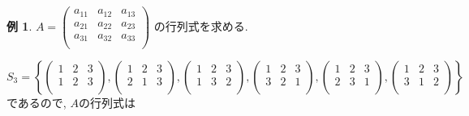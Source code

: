 \documentclass[dvipdfmx,a4paper,11pt]{article}
\theoremstyle{definition}
\newtheorem{exa}[thm]{例}
\begin{document}
\begin{exa}
$A = 
  \begin{pmatrix}
a_{11}& a_{12} & a_{13}\\
a_{21}& a_{22} & a_{23}\\
a_{31}& a_{32} & a_{33}\\
 \end{pmatrix} 
$
の行列式を求める.

$S_3 = \left\{   
\begin{pmatrix}
1& 2 &3\\
1& 2 &3\\
 \end{pmatrix} , 
\begin{pmatrix}
1& 2 &3\\
2& 1 &3\\
 \end{pmatrix} , 
\begin{pmatrix}
1& 2 &3\\
1& 3 &2\\
 \end{pmatrix} , 
 \begin{pmatrix}
1& 2 &3\\
3& 2 &1\\
 \end{pmatrix} , 
 \begin{pmatrix}
1& 2 &3\\
2& 3 &1\\
 \end{pmatrix} , 
 \begin{pmatrix}
1& 2 &3\\
3& 1 &2\\
 \end{pmatrix}
  \right\}$
  であるので, $A$の行列式は
  

\end{exa}
\end{document}
